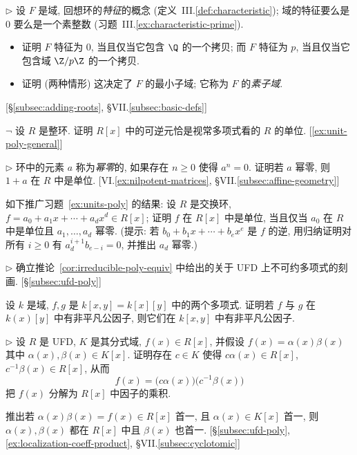 \begin{prob}
\label{ex:prime-subfield}
$\triangleright$ 设 $F$ 是域, 回想环的\emph{特征}的概念 (定义~III.\ref{def:characteristic}); 域的特征要么是 $0$ 要么是一个素整数 (习题~III.\ref{ex:characteristic-prime}).
\begin{itemize}
\item 证明 $F$ 特征为 $0$, 当且仅当它包含 $\Q$ 的一个拷贝; 而 $F$ 特征为 $p$, 当且仅当它包含域 $\Z/p\Z$ 的一个拷贝.
\item 证明 (两种情形) 这决定了 $F$ 的最小子域; 它称为 $F$ 的\emph{素子域}.
\end{itemize}
[§\ref{subsec:adding-roots}, §VII.\ref{subsec:basic-defs}]
\end{prob}

\begin{prob}
\label{ex:units-poly}
$\neg$ 设 $R$ 是整环. 证明 $R[x]$ 中的可逆元恰是视常多项式看的 $R$ 的单位. [\ref{ex:unit-poly-general}]
\end{prob}

\begin{prob}
\label{ex:nilpotent-unit}
$\triangleright$ 环中的元素 $a$ 称为\emph{幂零}的, 如果存在 $n\ge 0$ 使得 $a^n=0$. 证明若 $a$ 幂零, 则 $1+a$ 在 $R$ 中是单位. [VI.\ref{ex:nilpotent-matrices}, §VII.\ref{subsec:affine-geometry}]
\end{prob}

\begin{prob}
\label{ex:unit-poly-general}
如下推广习题~\ref{ex:units-poly} 的结果: 设 $R$ 是交换环, $f=a_0+a_1x+\cdots+a_dx^d\in R[x]$; 证明 $f$ 在 $R[x]$ 中是单位, 当且仅当 $a_0$ 在 $R$ 中是单位且 $a_1,\dots,a_d$ 幂零. (提示: 若 $b_0+b_1x+\cdots+b_ex^e$ 是 $f$ 的逆, 用归纳证明对所有 $i\ge 0$ 有 $a_d^{i+1}b_{e-i}=0$, 并推出 $a_d$ 幂零.)
\end{prob}

\begin{prob}
\label{ex:cor4-17}
$\triangleright$ 确立推论~\ref{cor:irreducible-poly-equiv} 中给出的关于 UFD 上不可约多项式的刻画. [§\ref{subsec:ufd-poly}]
\end{prob}

\begin{prob}
\label{ex:common-factor-kxy}
设 $k$ 是域, $f,g$ 是 $k[x,y]=k[x][y]$ 中的两个多项式. 证明若 $f$ 与 $g$ 在 $k(x)[y]$ 中有非平凡公因子, 则它们在 $k[x,y]$ 中有非平凡公因子.
\end{prob}

\begin{prob}
\label{ex:poly-split-rx}
$\triangleright$ 设 $R$ 是 UFD, $K$ 是其分式域, $f(x)\in R[x]$, 并假设 $f(x)=\alpha(x)\beta(x)$ 其中 $\alpha(x),\beta(x)\in K[x]$. 证明存在 $c\in K$ 使得 $c\alpha(x)\in R[x]$, $c^{-1}\beta(x)\in R[x]$, 从而
\[
f(x) = \bigl(c\alpha(x)\bigr)\bigl(c^{-1}\beta(x)\bigr)
\]
把 $f(x)$ 分解为 $R[x]$ 中因子的乘积.

\noindent 推出若 $\alpha(x)\beta(x)=f(x)\in R[x]$ 首一, 且 $\alpha(x)\in K[x]$ 首一, 则 $\alpha(x),\beta(x)$ 都在 $R[x]$ 中且 $\beta(x)$ 也首一. [§\ref{subsec:ufd-poly}, \ref{ex:localization-coeff-product}, §VII.\ref{subsec:cyclotomic}]
\end{prob}

